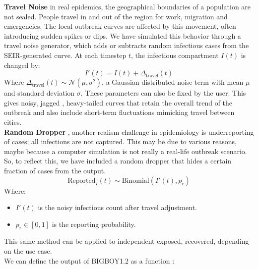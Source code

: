 \documentclass[11pt,a4paper]{article}
\theoremstyle{remark}\newtheorem{remark}{Remark}
\begin{document}
\textbf{Travel Noise} in real epidemics, the geographical boundaries of a population are not sealed. People travel in and out of the region for work, migration and emergencies. The local outbreak curves are affected by this movement, often introducing sudden spikes or dips. We have simulated this behavior through a travel noise generator, which adds or subtracts random infectious cases from the SEIR-generated curve. At each timestep $t$, the infectious compartment $I(t)$ is changed by:
\begin{equation*}
I'(t) = I(t) + \Delta_{\text{travel}}(t)
\end{equation*}
Where $\Delta_{\text{travel}}(t) \sim \mathcal{N}(\mu, \sigma^2)$, a Gaussian-distributed noise term with mean $\mu$ and standard deviation $\sigma$. These parameters can also be fixed by the user. This gives noisy, jagged , heavy-tailed curves that retain the overall trend of the outbreak and also include short-term fluctuations mimicking travel between cities. \\
\textbf{Random Dropper} , another realism challenge in epidemiology is underreporting of cases; all infections are not captured. This may be due to various reasons, maybe because a computer simulation is not really a real-life outbreak scenario. So, to reflect this, we have included a random dropper that hides a certain fraction of cases from the output. 
\begin{equation*}
\text{Reported}_I(t) \sim \text{Binomial}(I'(t), p_r)
\end{equation*}
Where:
\begin{itemize}
    \item $I'(t)$ is the noisy infectious count after travel adjustment.
    \item $p_r \in [0,1]$ is the reporting probability.
\end{itemize}
This same method can be applied to independent exposed, recovered, depending on the use case.\\
We can define the output of BIGBOY1.2 as a function : 
\begin{center} %
\end{center}
\end{document}
